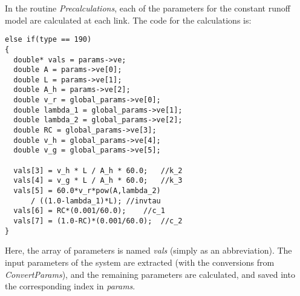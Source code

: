 \documentclass[12pt]{article}
\begin{document}
In the routine \emph{Precalculations}, each of the parameters for the constant runoff model are calculated at each link. The code for the calculations is:
\begin{lstlisting}[style=CStyle]
else if(type == 190)
{
  double* vals = params->ve;
  double A = params->ve[0];
  double L = params->ve[1];
  double A_h = params->ve[2];
  double v_r = global_params->ve[0];
  double lambda_1 = global_params->ve[1];
  double lambda_2 = global_params->ve[2];
  double RC = global_params->ve[3];
  double v_h = global_params->ve[4];
  double v_g = global_params->ve[5];

  vals[3] = v_h * L / A_h * 60.0;	//k_2
  vals[4] = v_g * L / A_h * 60.0;	//k_3
  vals[5] = 60.0*v_r*pow(A,lambda_2) 
      / ((1.0-lambda_1)*L);	//invtau
  vals[6] = RC*(0.001/60.0);	//c_1
  vals[7] = (1.0-RC)*(0.001/60.0);	//c_2
}
\end{lstlisting}
Here, the array of parameters is named \emph{vals} (simply as an abbreviation). The input parameters of the system are extracted (with the conversions from \emph{ConvertParams}), and the remaining parameters are calculated, and saved into the corresponding index in \emph{params}.
\end{document}
